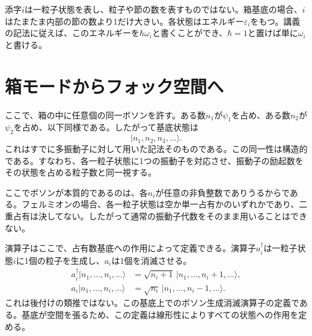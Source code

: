 添字\(i\)は一粒子状態を表し、粒子や節の数を表すものではない。箱基底の場合、\(i\)はたまたま内部の節の数より1だけ大きい。各状態はエネルギー\(\varepsilon_i\)をもつ。講義の記法に従えば、このエネルギーを\(\hbar\omega_i\)と書くことができ、\(\hbar=1\)と置けば単に\(\omega_i\)と書ける。

\begin{classroomqa}
\end{classroomqa}

\begin{classroomqa}
\end{classroomqa}

\section{箱モードからフォック空間へ}

ここで、箱の中に任意個の同一ボソンを許す。ある数\(n_1\)が\(\psi_1\)を占め、ある数\(n_2\)が\(\psi_2\)を占め、以下同様である。したがって基底状態は
\begin{equation}
|n_1,n_2,n_3,\ldots\rangle.
\end{equation}
これはすでに多振動子に対して用いた記法そのものである。この同一性は構造的である。すなわち、各一粒子状態に1つの振動子を対応させ、振動子の励起数をその状態を占める粒子数と同一視する。

ここでボソンが本質的であるのは、各\(n_i\)が任意の非負整数でありうるからである。フェルミオンの場合、各一粒子状態は空か単一占有かのいずれかであり、二重占有は決してない。したがって通常の振動子代数をそのまま用いることはできない。

演算子はここで、占有数基底への作用によって定義できる。演算子\(a_i^\dagger\)は一粒子状態\(i\)に1個の粒子を生成し、\(a_i\)は1個を消滅させる。
\begin{align}
a_i^\dagger|n_1,\ldots,n_i,\ldots\rangle
&=\sqrt{n_i+1}\,|n_1,\ldots,n_i+1,\ldots\rangle, \\
a_i|n_1,\ldots,n_i,\ldots\rangle
&=\sqrt{n_i}\,|n_1,\ldots,n_i-1,\ldots\rangle.
\end{align}
これは後付けの類推ではない。この基底上でのボソン生成消滅演算子の定義である。基底が空間を張るため、この定義は線形性によりすべての状態への作用を定める。

